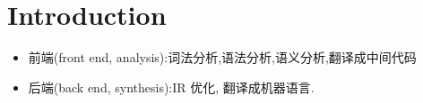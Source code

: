\section{Introduction}

\begin{itemize}
    \item 前端(front end, analysis):词法分析,语法分析,语义分析,翻译成中间代码
    \item 后端(back end, synthesis):IR 优化, 翻译成机器语言.
\end{itemize}